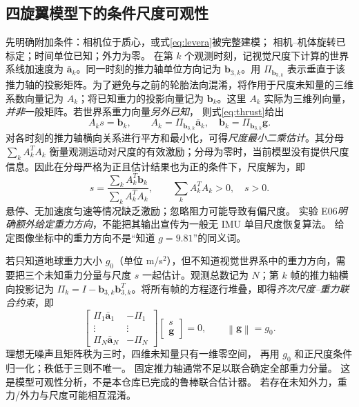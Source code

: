 \documentclass[UTF8,a4paper,fontset=fandol,11pt]{ctexart}
\newcommand{\norm}[1]{\left\lVert#1\right\rVert}
\newcommand{\vct}[1]{\bm #1}
\begin{document}
\subsection{四旋翼模型下的条件尺度可观性}
先明确附加条件：相机位于质心，或式\eqref{eq:levera}被完整建模；
相机--机体旋转已标定；时间单位已知；外力为零。
在第 $k$ 个观测时刻，记视觉尺度下计算的世界系线加速度为 $\bar{\vct a}_k$。同一时刻的推力轴单位方向记为 $\vct b_{3,k}$。用 $\Pi_{\vct b_{3,k}}$ 表示垂直于该推力轴的投影矩阵。为了避免与之前的轮胎法向混淆，将作用于尺度未知量的三维系数向量记为 $A_k$；将已知重力的投影向量记为 $\vct b_k$。这里 $A_k$ 实际为三维列向量，\emph{并非}一般矩阵。若世界系重力向量\emph{另外已知}，
则式\eqref{eq:thrust}给出
\begin{equation}
 A_k s=\vct b_k,\qquad
 A_k=\Pi_{\vct b_{3,k}}\bar{\vct a}_k,
 \quad\vct b_k=\Pi_{\vct b_{3,k}}\vct g.
\end{equation}
对各时刻的推力轴横向关系进行平方和最小化，可得\emph{尺度最小二乘估计}。其分母 $\sum_k A_k^TA_k$ 衡量观测运动对尺度的有效激励；分母为零时，当前模型没有提供尺度信息。因此在分母严格为正且估计结果也为正的条件下，尺度解为，即
\begin{equation}\label{eq:quadscale}
 s=\frac{\sum_k A_k^T\vct b_k}{\sum_k A_k^TA_k},
 \qquad\sum_k A_k^TA_k>0,\quad s>0.
\end{equation}
悬停、无加速度匀速等情况缺乏激励；忽略阻力可能导致有偏尺度。
实验 E06\emph{明确额外给定重力方向}，不能把其输出宣传为一般无 IMU 单目尺度恢复算法。
给定图像坐标中的重力方向不是“知道 $g=9.81$”的同义词。

若只知道地球重力大小 $g_0$（单位 m/s$^2$），但不知道视觉世界系中的重力方向，需要把三个未知重力分量与尺度 $s$ 一起估计。观测总数记为 $N$；第 $k$ 帧的推力轴横向投影记为 $\Pi_k=I-\vct b_{3,k}\vct b_{3,k}^T$。将所有帧的方程逐行堆叠，即得\emph{齐次尺度--重力联合约束}，即
\begin{equation}\label{eq:unknown_g}
 \begin{bmatrix}
 \Pi_1\bar{\vct a}_1&-\Pi_1\\
 \vdots&\vdots\\
 \Pi_N\bar{\vct a}_N&-\Pi_N
 \end{bmatrix}
 \begin{bmatrix}s\\\vct g\end{bmatrix}=0,
 \qquad\norm{\vct g}=g_0.
\end{equation}
理想无噪声且矩阵秩为三时，四维未知量只有一维零空间，
再用 $g_0$ 和正尺度条件归一化；秩低于三则不唯一。
固定推力轴通常不足以联合确定全部重力分量。
这是模型可观性分析，不是本仓库已完成的鲁棒联合估计器。
若存在未知外力，重力/外力与尺度可能相互混淆。
\end{document}
